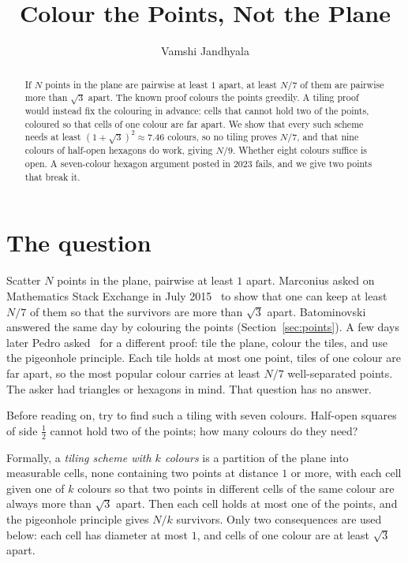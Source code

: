 \documentclass[11pt]{amsart}
\title{Colour the Points, Not the Plane}
\author{Vamshi Jandhyala}
\theoremstyle{remark}
\begin{document}
\begin{abstract}
If $N$ points in the plane are pairwise at least $1$ apart, at least $N/7$ of them are pairwise more than $\sqrt3$ apart. The known proof colours the points greedily. A tiling proof would instead fix the colouring in advance: cells that cannot hold two of the points, coloured so that cells of one colour are far apart. We show that every such scheme needs at least $(1+\sqrt3)^2\approx7.46$ colours, so no tiling proves $N/7$, and that nine colours of half-open hexagons do work, giving $N/9$. Whether eight colours suffice is open. A seven-colour hexagon argument posted in 2023 fails, and we give two points that break it.
\end{abstract}

\maketitle

\section{The question}

Scatter $N$ points in the plane, pairwise at least $1$ apart. Marconius asked on Mathematics Stack Exchange in July 2015~\cite{MSEa} to show that one can keep at least $N/7$ of them so that the survivors are more than $\sqrt3$ apart. Batominovski answered the same day by colouring the points (Section~\ref{sec:points}). A few days later Pedro asked~\cite{MSEb} for a different proof: tile the plane, colour the tiles, and use the pigeonhole principle. Each tile holds at most one point, tiles of one colour are far apart, so the most popular colour carries at least $N/7$ well-separated points. The asker had triangles or hexagons in mind. That question has no answer.

Before reading on, try to find such a tiling with seven colours. Half-open squares of side $\frac12$ cannot hold two of the points; how many colours do they need?

Formally, a \emph{tiling scheme with $k$ colours} is a partition of the plane into measurable cells, none containing two points at distance $1$ or more, with each cell given one of $k$ colours so that two points in different cells of the same colour are always more than $\sqrt3$ apart. Then each cell holds at most one of the points, and the pigeonhole principle gives $N/k$ survivors. Only two consequences are used below: each cell has diameter at most $1$, and cells of one colour are at least $\sqrt3$ apart.
\end{document}
